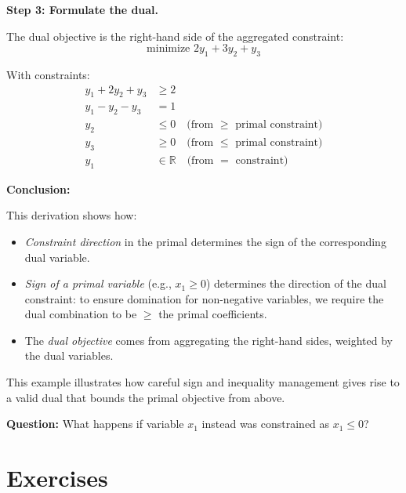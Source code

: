 \vspace{0.5em}
\textbf{Step 3: Formulate the dual.}

The dual objective is the right-hand side of the aggregated constraint:
\[
\text{minimize } 2y_1 + 3y_2 + y_3
\]

With constraints:
\[
\begin{aligned}
y_1 + 2y_2 + y_3 &\geq 2 \\
y_1 - y_2 - y_3 &= 1 \\
y_2 &\leq 0 \quad \text{(from } \geq \text{ primal constraint)} \\
y_3 &\geq 0 \quad \text{(from } \leq \text{ primal constraint)} \\
y_1 &\in \mathbb{R} \quad \text{(from } = \text{ constraint)}
\end{aligned}
\]

\vspace{0.5em}
\textbf{Conclusion:}

This derivation shows how:
\begin{itemize}
  \item \emph{Constraint direction} in the primal determines the sign of the corresponding dual variable.
  \item \emph{Sign of a primal variable} (e.g., \( x_1 \geq 0 \)) determines the direction of the dual constraint: to ensure domination for non-negative variables, we require the dual combination to be \(\geq\) the primal coefficients.
  \item The \emph{dual objective} comes from aggregating the right-hand sides, weighted by the dual variables.
\end{itemize}
This example illustrates how careful sign and inequality management gives rise to a valid dual that bounds the primal objective from above.

\textbf{Question:} What happens if variable $x_1$ instead was constrained as $x_1 \leq 0$?

\section{Exercises}


